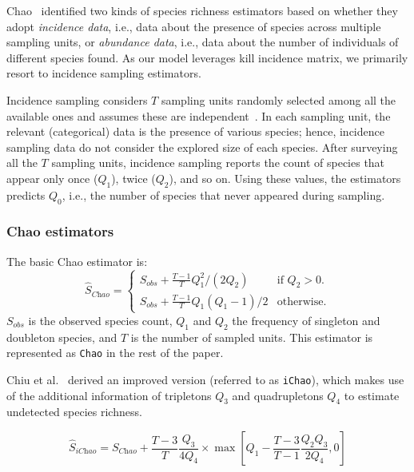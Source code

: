 \documentclass[sigconf]{acmart}
\newcommand{\Chao}{Chao\xspace}
\newcommand{\chao}{$\hat{S}_\textit{Chao}$\xspace}
\def\<#1>{\texttt{#1}}
\begin{document}
Chao~\cite{chao2016species} identified two kinds of species richness
estimators based on whether they adopt \emph{incidence data}, i.e., data about the
presence of species across multiple sampling units, or \emph{abundance data}, i.e.,
data about the number of individuals of different species found.
As our model leverages kill incidence matrix, we primarily resort to incidence sampling estimators.

Incidence sampling considers $T$ sampling units randomly selected among all
the available ones and assumes these are independent~\cite{chao2016species}.
In each sampling unit, the relevant (categorical) data is the presence of various species;
hence, incidence sampling data do not consider the explored size of each species.
After surveying all the $T$ sampling units, incidence sampling reports the count of species
that appear only once ($Q_1$), twice ($Q_2$), and so on. %
Using these values, the estimators predicts $Q_0$, i.e., the number of species that never
appeared during sampling.

\subsubsection{Chao estimators~\cite{chao1984nonparametric}}
The basic \Chao estimator
is: %
\begin{displaymath}
\text{\chao}=\begin{cases}
    S_{\textit{obs}} + \frac{T-1}{T} Q_1^2/(2Q_2) & \text{if $Q_2>0$}.\\
    S_{\textit{obs}} + \frac{T-1}{T} Q_1(Q_1-1)/2 & \text{otherwise}.
  \end{cases}
\end{displaymath}
$S_{\textit{obs}}$ is the observed species count,
$Q_1$ and $Q_2$ the frequency of singleton and doubleton species,
and $T$ is the number of sampled units.
This estimator is represented as \<\Chao>
in the rest of the paper.

Chiu et al.~\cite{chiu2014improved} derived an improved version (referred to as \<iChao>), which makes use of the additional
information of tripletons $Q_3$ and quadrupletons $Q_4$ to estimate undetected species richness.

\begin{displaymath}
  \hat{S}_\textit{iChao}= S_{\textit{Chao}} + \frac{T-3}{T} \frac{Q_3}{4Q_4} \times \max\left[Q_1 - \frac{T-3}{T-1}\frac{Q_2Q_3}{2Q_4}, 0\right]
\end{displaymath}
\end{document}
